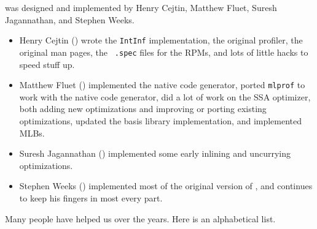 %
{\mlton} was designed and implemented by Henry Cejtin, Matthew Fluet, Suresh
Jagannathan, and Stephen Weeks.

\begin{itemize}

\item
Henry Cejtin () wrote the {\tt IntInf}
implementation, the original profiler, the original man pages, the {\tt
.spec} files for the RPMs, and lots of little hacks to speed stuff up.

\item
Matthew Fluet () implemented the
{\intel} native code generator, ported {\tt mlprof} to work with the
native code generator, did a lot of work on the SSA optimizer, both
adding new optimizations and improving or porting existing
optimizations, updated the basis library implementation, and
implemented MLBs.

\item
Suresh Jagannathan () implemented
some early inlining and uncurrying optimizations.

\item
Stephen Weeks () implemented most of the original
version of {\mlton}, and continues to keep his fingers in most every part.

\end{itemize}
Many people have helped us over the years.  Here is an alphabetical list.

